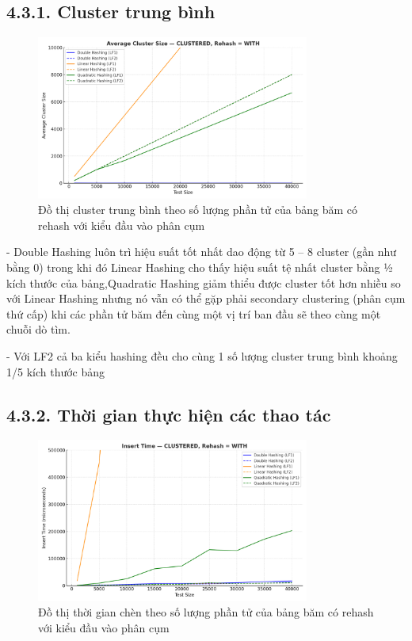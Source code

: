\documentclass[12pt,a4paper]{report}
\begin{document}
\subsection*{4.3.1. Cluster trung bình}
\begin{figure}[!ht]
    \centering
    \includegraphics[width=0.8\textwidth]{clus_clus_hash.png}
    \caption{Đồ thị cluster trung bình theo số lượng phần tử của bảng băm có rehash với kiểu đầu vào phân cụm}
    \label{fig:flowchart}
\end{figure}
\noindent \indent -	Double Hashing luôn trì hiệu suất tốt nhất dao động từ 5 – 8 cluster (gần như bằng 0) trong khi đó Linear Hashing cho thấy hiệu suất tệ nhất cluster bằng ½ kích thước của bảng,Quadratic Hashing giảm thiểu được cluster tốt hơn nhiều so với Linear Hashing nhưng nó vẫn có thể gặp phải secondary clustering (phân cụm thứ cấp) khi các phần tử băm đến cùng một vị trí ban đầu sẽ theo cùng một chuỗi dò tìm.

-	Với LF2 cả ba kiểu hashing đều cho cùng 1 số lượng cluster trung bình khoảng 1/5 kích thước bảng


\subsection*{4.3.2. Thời gian thực hiện các thao tác}
\begin{figure}[!ht]
    \centering
    \includegraphics[width=0.8\textwidth]{clus_ins_hash.png}
    \caption{Đồ thị thời gian chèn theo số lượng phần tử của bảng băm có rehash với kiểu đầu vào phân cụm}
    \label{fig:flowchart}
\end{figure}
\end{document}
